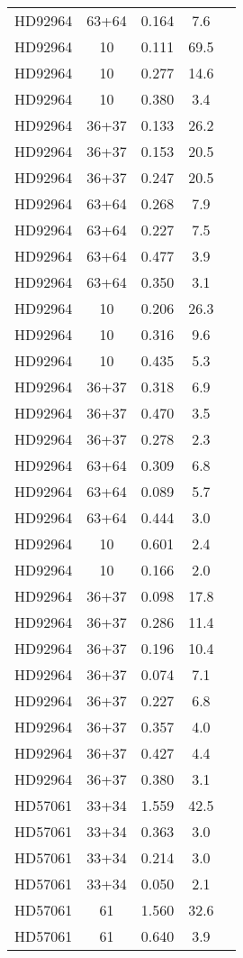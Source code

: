 \begin{table*}
\begin{tabular}{l c c c c}
HD92964 & 63+64 & 0.164 & 7.6\\ 
HD92964 & 10 & 0.111 & 69.5\\ 
HD92964 & 10 & 0.277 & 14.6\\ 
HD92964 & 10 & 0.380 & 3.4\\ 
HD92964 & 36+37 & 0.133 & 26.2\\ 
HD92964 & 36+37 & 0.153 & 20.5\\ 
HD92964 & 36+37 & 0.247 & 20.5\\ 
HD92964 & 63+64 & 0.268 & 7.9\\ 
HD92964 & 63+64 & 0.227 & 7.5\\ 
HD92964 & 63+64 & 0.477 & 3.9\\ 
HD92964 & 63+64 & 0.350 & 3.1\\ 
HD92964 & 10 & 0.206 & 26.3\\ 
HD92964 & 10 & 0.316 & 9.6\\ 
HD92964 & 10 & 0.435 & 5.3\\ 
HD92964 & 36+37 & 0.318 & 6.9\\ 
HD92964 & 36+37 & 0.470 & 3.5\\ 
HD92964 & 36+37 & 0.278 & 2.3\\ 
HD92964 & 63+64 & 0.309 & 6.8\\ 
HD92964 & 63+64 & 0.089 & 5.7\\ 
HD92964 & 63+64 & 0.444 & 3.0\\ 
HD92964 & 10 & 0.601 & 2.4\\ 
HD92964 & 10 & 0.166 & 2.0\\ 
HD92964 & 36+37 & 0.098 & 17.8\\ 
HD92964 & 36+37 & 0.286 & 11.4\\ 
HD92964 & 36+37 & 0.196 & 10.4\\ 
HD92964 & 36+37 & 0.074 & 7.1\\ 
HD92964 & 36+37 & 0.227 & 6.8\\ 
HD92964 & 36+37 & 0.357 & 4.0\\ 
HD92964 & 36+37 & 0.427 & 4.4\\ 
HD92964 & 36+37 & 0.380 & 3.1\\ 
\hline
HD57061 & 33+34 & 1.559 & 42.5\\ 
HD57061 & 33+34 & 0.363 & 3.0\\ 
HD57061 & 33+34 & 0.214 & 3.0\\ 
HD57061 & 33+34 & 0.050 & 2.1\\ 
HD57061 & 61 & 1.560 & 32.6\\ 
HD57061 & 61 & 0.640 & 3.9\\ 

\end{tabular}
\end{table*}
